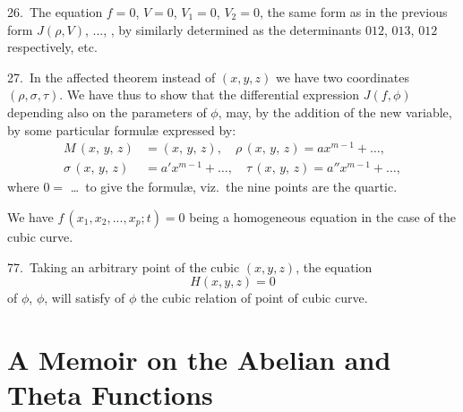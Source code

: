 \documentclass[11pt,a4paper]{book}
\begin{document}
26.\ The equation $f = 0$, $V = 0$, $V_1 = 0$, $V_2 = 0$, the same form as in the previous form $J(\rho, V)$, ..., , by similarly determined as the determinants $012$, $013$, $012$ respectively, etc.

\bigskip

27.\ In the affected theorem instead of $(x, y, z)$ we have two coordinates $(\rho, \sigma, \tau)$. We have thus to show that the differential expression $J(f, \phi)$ depending also on the parameters of $\phi$, may, by the addition of the new variable, by some particular formul\ae{} expressed by:
\begin{align*}
M\,(x,\,y,\,z) &= (x,\,y,\,z),\quad \rho\,(x,\,y,\,z) = a x^{m-1} + \ldots,\\
\sigma\,(x,\,y,\,z) &= a' x^{m-1} + \ldots,\quad \tau\,(x,\,y,\,z) = a'' x^{m-1} + \ldots,
\end{align*}
where $0 = $ \dots\ to give the formul\ae{}, viz.\ the nine points are the quartic.

We have $f\,(x_1, x_2, ..., x_p; t) = 0$ being a homogeneous equation in the case of the cubic curve.

77.\ Taking an arbitrary point of the cubic $(x, y, z)$, the equation
\[
H(x, y, z) = 0
\]
of $\phi$, $\phi$, will satisfy of $\phi$ the cubic relation of point of cubic curve.

\bigskip
\clearpage


\section*{A Memoir on the Abelian and Theta Functions}

\setcounter{page}{151}
\setcounter{section}{2}
\end{document}
